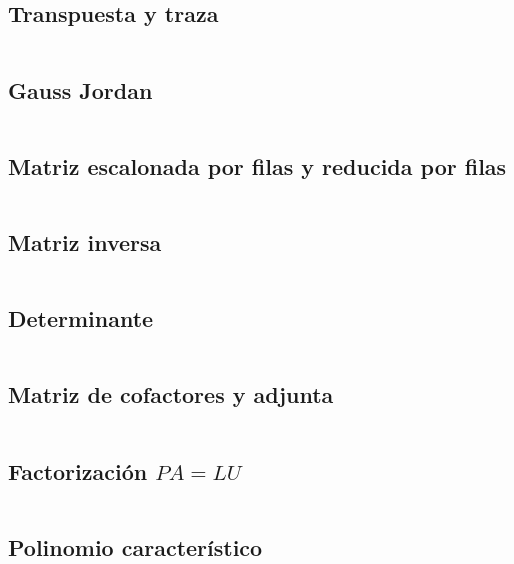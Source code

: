 \documentclass[11pt]{article}
\begin{document}
		\subsection{Transpuesta y traza}
		\inputminted[tabsize=2,breaklines,firstline=132,lastline=145,fontsize=\small]{c++}{matrix.cpp}
		
		\subsection{Gauss Jordan}
		\inputminted[tabsize=2,breaklines,firstline=147,lastline=190,fontsize=\small]{c++}{matrix.cpp}
		
		\subsection{Matriz escalonada por filas y reducida por filas}
		\inputminted[tabsize=2,breaklines,firstline=192,lastline=202,fontsize=\small]{c++}{matrix.cpp}
		
		\subsection{Matriz inversa}
		\inputminted[tabsize=2,breaklines,firstline=204,lastline=225,fontsize=\small]{c++}{matrix.cpp}
		
		\subsection{Determinante}
		\inputminted[tabsize=2,breaklines,firstline=227,lastline=240,fontsize=\small]{c++}{matrix.cpp}
		
		\subsection{Matriz de cofactores y adjunta}
		\inputminted[tabsize=2,breaklines,firstline=242,lastline=267,fontsize=\small]{c++}{matrix.cpp}
		
		\subsection{Factorización $PA=LU$}
		\inputminted[tabsize=2,breaklines,firstline=269,lastline=285,fontsize=\small]{c++}{matrix.cpp}
		
		\subsection{Polinomio característico}
		\inputminted[tabsize=2,breaklines,firstline=287,lastline=297,fontsize=\small]{c++}{matrix.cpp}
		
\end{document}
